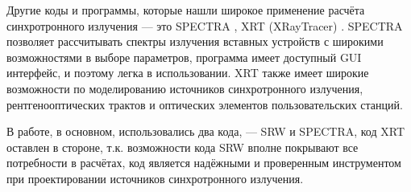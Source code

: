 Другие коды и программы, которые нашли широкое применение расчёта синхротронного излучения --- это  SPECTRA \cite{SPECTRA}, XRT (XRayTracer) \cite{XRayTracer}. SPECTRA позволяет рассчитывать спектры излучения вставных устройств с широкими возможностями в выборе параметров, программа имеет доступный GUI интерфейс, и поэтому легка в использовании. XRT также имеет широкие возможности по моделированию источников синхротронного излучения, рентгенооптических трактов и оптических элементов пользовательских станций.

В работе, в основном, использовались два кода, --- SRW и SPECTRA, код XRT оставлен в стороне, т.к. возможности кода SRW вполне покрывают все потребности в расчётах, код является надёжными и проверенным инструментом при проектировании источников синхротронного излучения. 








